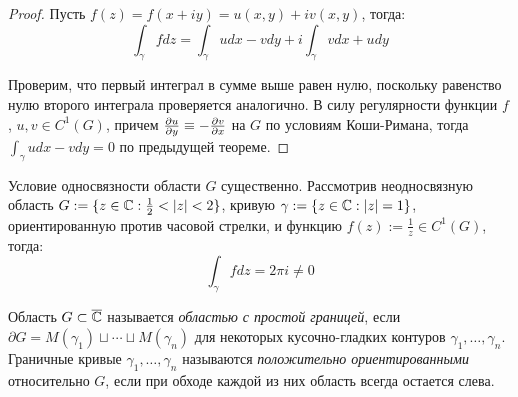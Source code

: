\begin{proof}
	Пусть $f(z) = f(x + iy) = u(x, y) + iv(x, y)$, тогда:
	\[\int_\gamma fdz = \int_\gamma udx - vdy + i\int_\gamma vdx + udy\]
	
	Проверим, что первый интеграл в сумме выше равен нулю, поскольку равенство нулю второго интеграла проверяется аналогично. В силу регулярности функции $f$, $u, v \in C^1(G)$, причем $\frac{\partial u}{\partial y} \equiv -\frac{\partial v}{\partial x}$ на $G$ по условиям Коши-Римана, тогда $\int_\gamma udx - vdy = 0$ по предыдущей теореме.
\end{proof}

\begin{note}
	Условие односвязности области $G$ существенно. Рассмотрив неодносвязную область $G := \{z \in \mathbb{C} : \frac12 < |z| < 2\}$, кривую $\gamma := \{z \in \mathbb{C} : |z| = 1\}$, ориентированную против часовой стрелки, и функцию $f(z) := \frac 1z \in C^1(G)$, тогда:
	\[\int_\gamma fdz = 2\pi i  \ne 0\]
\end{note}

\begin{definition}
	Область $G \subset \overline{\mathbb{C}}$ называется \textit{областью с простой границей}, если $\partial{G} = M(\gamma_1) \sqcup \dotsb \sqcup M(\gamma_n)$ для некоторых кусочно-гладких контуров $\gamma_1, \dotsc, \gamma_n$. Граничные кривые $\gamma_1, \dotsc, \gamma_n$ называются \textit{положительно ориентированными} относительно $G$, если при обходе каждой из них область всегда остается слева.
\end{definition}


